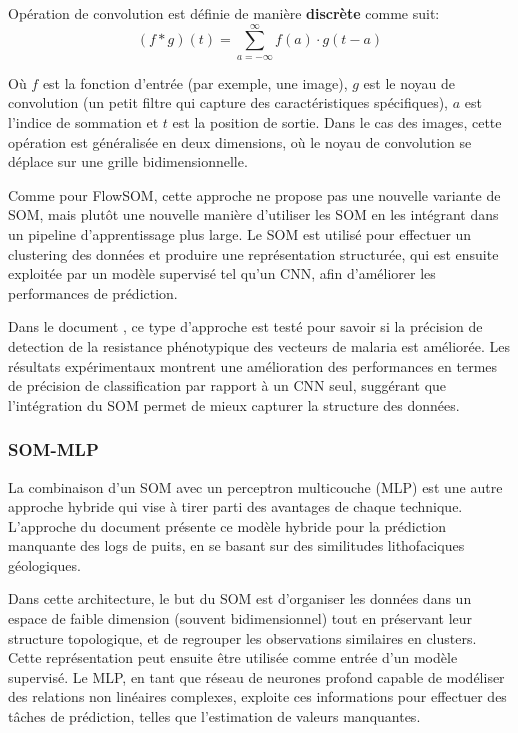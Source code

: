 \documentclass[12pt,a4paper]{report}
\begin{document}
Opération de convolution est définie de manière \textbf{discrète} comme suit:
$$ (f * g)(t) = \sum_{a=-\infty}^{\infty} f(a) \cdot g(t - a) $$

Où $f$ est la fonction d'entrée (par exemple, une image), $g$ est le noyau de convolution (un petit filtre qui capture des caractéristiques spécifiques), $a$ est l'indice de sommation 
et $t$ est la position de sortie. Dans le cas des images, cette opération est généralisée en deux dimensions, où le noyau de convolution se déplace sur une grille bidimensionnelle.

Comme pour FlowSOM, cette approche ne propose pas une nouvelle variante de SOM, mais plutôt une nouvelle manière d'utiliser les SOM en les intégrant dans un pipeline d'apprentissage plus large.
Le SOM est utilisé pour effectuer un clustering des données et produire une représentation structurée, qui est ensuite exploitée par un modèle supervisé 
tel qu'un CNN, afin d'améliorer les performances de prédiction.

Dans le document \cite{CNN_SOM}, ce type d'approche est testé pour savoir si la précision de detection de la resistance phénotypique des vecteurs de malaria est améliorée. 
Les résultats expérimentaux montrent une amélioration des performances en termes de précision de classification par rapport à un CNN seul, 
suggérant que l'intégration du SOM permet de mieux capturer la structure des données.

\subsubsection{SOM-MLP}
La combinaison d'un SOM avec un perceptron multicouche (MLP) est une autre approche hybride qui vise à tirer parti des avantages de chaque technique.
L'approche du document \cite{MLP_SOM} présente ce modèle hybride pour la prédiction manquante des logs de puits, en se basant sur des similitudes lithofaciques géologiques.

Dans cette architecture, le but du SOM est d'organiser les données dans un espace de faible dimension (souvent bidimensionnel) tout en préservant leur structure topologique, 
et de regrouper les observations similaires en clusters. Cette représentation peut ensuite être utilisée comme entrée d'un modèle supervisé. Le MLP, en tant que réseau de neurones 
profond capable de modéliser des relations non linéaires complexes, exploite ces informations pour effectuer des tâches de prédiction, telles que l'estimation de valeurs manquantes. 
\end{document}
